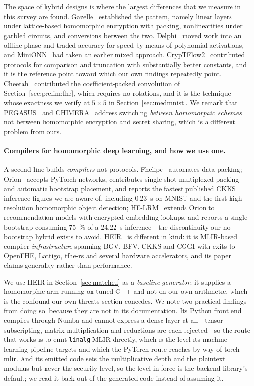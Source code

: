 \documentclass[11pt]{article}
\begin{document}
The space of hybrid designs is where the largest differences that we measure in this survey
are found. Gazelle~\cite{Gazelle} established the pattern, namely linear layers under lattice-based
homomorphic encryption with packing, nonlinearities under garbled circuits, and conversions between
the two. Delphi~\cite{Delphi} moved work into an offline phase and traded accuracy for speed by
means of polynomial activations, and MiniONN~\cite{MiniONN} had taken an earlier mixed approach.
CrypTFlow2~\cite{CrypTFlow2} contributed protocols for comparison and truncation with substantially
better constants, and it is the reference point toward which our own findings repeatedly point.
Cheetah~\cite{Cheetah} contributed the coefficient-packed convolution of
Section~\ref{sec:prelim:fhe}, which requires no rotations, and it is the technique whose exactness
we verify at $5\times5$ in Section~\ref{sec:medmnist}. We remark that PEGASUS~\cite{PEGASUS} and
CHIMERA~\cite{CHIMERA} address switching \emph{between homomorphic schemes} not between
homomorphic encryption and secret sharing, which is a different problem from ours.

\paragraph{Compilers for homomorphic deep learning, and how we use one.}
A second line builds \emph{compilers} not protocols.
Fhelipe~\cite{Fhelipe} automates data packing; Orion~\cite{Orion} accepts PyTorch
networks, contributes single-shot multiplexed packing and automatic bootstrap
placement, and reports the fastest published CKKS inference figures we are aware
of, including \SI{0.23}{\second} on MNIST and the first high-resolution
homomorphic object detection; HE-LRM~\cite{HELRM} extends Orion to recommendation
models with encrypted embedding lookups, and reports a single bootstrap consuming
\SI{75}{\percent} of a \SI{24.22}{\second} inference---the discontinuity our
no-bootstrap hybrid exists to avoid. HEIR~\cite{HEIR} is different in kind: it is
MLIR-based compiler \emph{infrastructure} spanning BGV, BFV, CKKS and CGGI with
exits to OpenFHE, Lattigo, tfhe-rs and several hardware accelerators, and its paper
claims generality rather than performance.

We use HEIR in Section~\ref{sec:matched} as a \emph{baseline generator}: it supplies
a homomorphic arm running on tuned C++ and not on our own arithmetic, which is
the confound our own threats section concedes. We note two practical findings from
doing so, because they are not in its documentation. Its Python front end compiles
through Numba and cannot express a dense layer at all---tensor subscripting,
matrix multiplication and reductions are each rejected---so the route that works is
to emit \texttt{linalg} MLIR directly, which is the level its machine-learning
pipeline targets and which the PyTorch route reaches by way of torch-mlir. And its
emitted code sets the multiplicative depth and the plaintext modulus but never the
security level, so the level in force is the backend library's default; we read it
back out of the generated code instead of assuming it.
\end{document}
